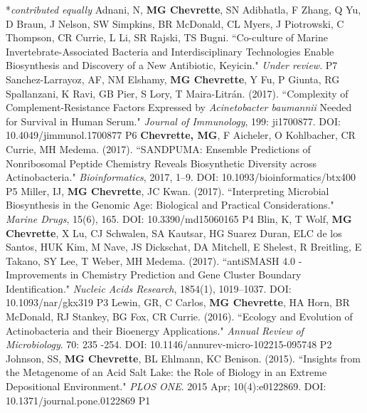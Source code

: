 


\begin{cvpubs}
  \cvpub
    {\hspace{-1cm} *\textit{contributed equally}} %
    {} %
  \cvpub
    {Adnani, N, \textbf{MG Chevrette}, SN Adibhatla, F Zhang, Q Yu, D Braun, J Nelson, SW Simpkins, BR McDonald, CL Myers, J Piotrowski, C Thompson, CR Currie, L Li, SR Rajski, TS Bugni. ``Co-culture of Marine Invertebrate-Associated Bacteria and Interdisciplinary Technologies Enable Biosynthesis and Discovery of a New Antibiotic, Keyicin." \textit{Under review}.} %
    {P7} %
  \cvpub
    {Sanchez-Larrayoz, AF, NM Elshamy, \textbf{MG Chevrette}, Y Fu, P Giunta, RG Spallanzani, K Ravi, GB Pier, S Lory, T Maira-Litr\'{a}n. (2017). ``Complexity of Complement-Resistance Factors Expressed by \textit{Acinetobacter baumannii} Needed for Survival in Human Serum." \textit{Journal of Immunology}, 199: ji1700877. DOI: 10.4049/jimmunol.1700877} %
    {P6} %
  \cvpub
    {\textbf{Chevrette, MG}, F Aicheler, O Kohlbacher, CR Currie, MH Medema. (2017). ``SANDPUMA: Ensemble Predictions of Nonribosomal Peptide Chemistry Reveals Biosynthetic Diversity across Actinobacteria." \textit{Bioinformatics}, 2017, 1–9. DOI: 10.1093/bioinformatics/btx400} %
    {P5} %
  \cvpub
    {Miller, IJ, \textbf{MG Chevrette}, JC Kwan. (2017). ``Interpreting Microbial Biosynthesis in the Genomic Age: Biological and Practical Considerations." \textit{Marine Drugs}, 15(6), 165. DOI: 10.3390/md15060165} %
    {P4} %
  \cvpub
    {Blin, K, T Wolf, \textbf{MG Chevrette}, X Lu, CJ Schwalen, SA Kautsar, HG Suarez Duran, ELC de los Santos, HUK Kim, M Nave, JS Dickschat, DA Mitchell, E Shelest, R Breitling, E Takano, SY Lee, T Weber, MH Medema. (2017). ``antiSMASH 4.0 - Improvements in Chemistry Prediction and Gene Cluster Boundary Identification." \textit{Nucleic Acids Research}, 1854(1), 1019–1037. DOI: 10.1093/nar/gkx319}  %
    {P3} %
  \cvpub
    {Lewin, GR, C Carlos, \textbf{MG Chevrette}, HA Horn, BR McDonald, RJ Stankey, BG Fox, CR Currie. (2016). ``Ecology and Evolution of Actinobacteria and their Bioenergy Applications." \textit{Annual Review of Microbiology}. 70: 235 -254. DOI: 10.1146/annurev-micro-102215-095748} %
    {P2} %
  \cvpub
    {Johnson, SS, \textbf{MG Chevrette}, BL Ehlmann, KC Benison. (2015). ``Insights from the Metagenome of an Acid Salt Lake: the Role of Biology in an Extreme Depositional Environment."  \textit{PLOS ONE}. 2015 Apr; 10(4):e0122869. DOI: 10.1371/journal.pone.0122869} %
    {P1} %
\end{cvpubs}


